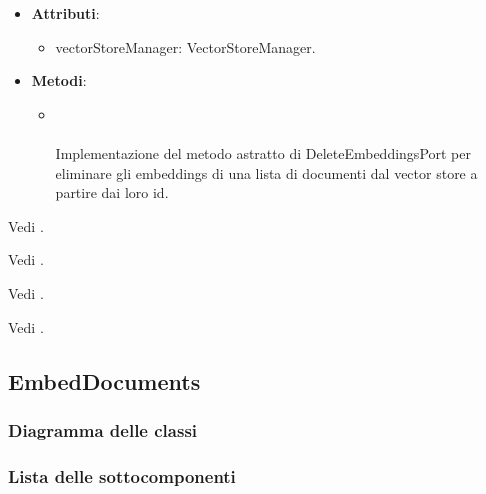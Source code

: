 \documentclass[10pt, a4paper]{article}
\begin{document}
\label{DeleteEmbeddingsVectorStoreDettaglio}
\begin{itemize}
    \item \textbf{Attributi}:
    \begin{itemize}
        \item vectorStoreManager: VectorStoreManager.
    \end{itemize}
    \item \textbf{Metodi}:
    \begin{itemize}
        \item {}\\ \\
        Implementazione del metodo astratto di DeleteEmbeddingsPort per eliminare gli embeddings di una lista di documenti dal vector store a partire dai loro id.
    \end{itemize}
\end{itemize}

Vedi .

Vedi .

Vedi .

Vedi .

\subsection{EmbedDocuments}
\subsubsection{Diagramma delle classi}
\subsubsection{Lista delle sottocomponenti}
\end{document}
